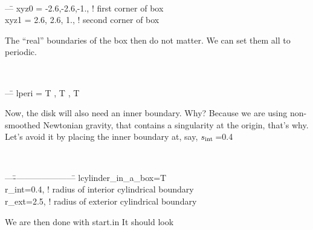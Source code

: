 \documentclass[a4paper,10pt]{article}
\newcommand{\rint}{$s_{\rm int}\,$}
\begin{document}
{\tt 
\begin{tabbing}
  ---\=\kill
  \>xyz0  = -2.6,-2.6,-1.,     ! first corner of box\\
  \>xyz1  =  2.6, 2.6, 1.,     ! second corner of box
\end{tabbing}
}

The ``real'' boundaries of the box then do not matter. We can set them all to periodic. 
{\tt 
\begin{tabbing}
  ---\=\kill
  \>lperi = T  , T  , T
\end{tabbing}
}


Now, the disk will also need an inner boundary. Why? Because we are using non-smoothed Newtonian gravity, that contains a singularity at the origin, that's why. Let's avoid it by placing the inner boundary at, say, \rint=0.4

{\tt 
\begin{tabbing}
  ---\=----------------------\=\kill
  \>lcylinder\_in\_a\_box=T\\
  \>r\_int=0.4,\>                   ! radius of interior cylindrical boundary\\
  \>r\_ext=2.5,\>                   ! radius of exterior cylindrical boundary
\end{tabbing}
}



We are then done with start.in It should look
\end{document}
